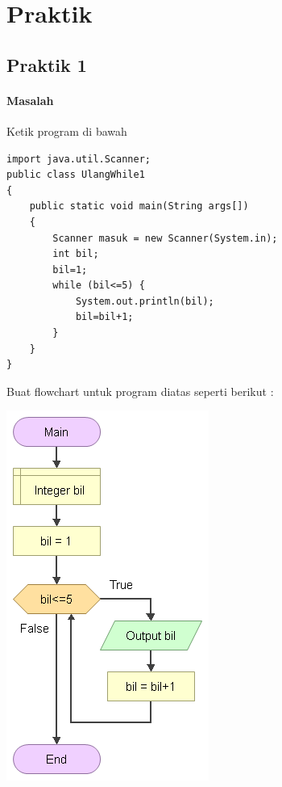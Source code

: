 \documentclass[a4paper,12pt]{article}
\begin{document}
\section{Praktik}
\subsection{Praktik 1}
\paragraph{Masalah\\}
Ketik program di bawah
\begin{lstlisting}
import java.util.Scanner;
public class UlangWhile1
{
    public static void main(String args[])
    {
        Scanner masuk = new Scanner(System.in);
        int bil;
        bil=1;
        while (bil<=5) {
            System.out.println(bil);
            bil=bil+1;
        }
    }
}
\end{lstlisting}
Buat flowchart untuk program diatas seperti berikut :\\
\begin{center}
	\includegraphics[scale=.5]{image--024}
\end{center}
\end{document}
